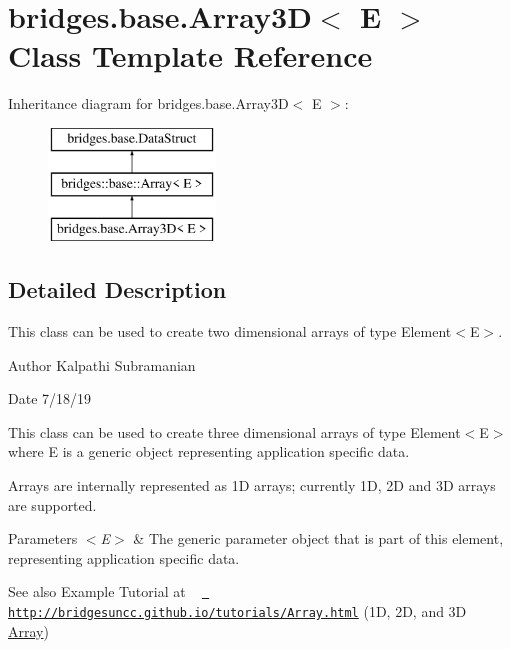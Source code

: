\hypertarget{classbridges_1_1base_1_1_array3_d}{}\section{bridges.\+base.\+Array3D$<$ E $>$ Class Template Reference}
\label{classbridges_1_1base_1_1_array3_d}
Inheritance diagram for bridges.\+base.\+Array3D$<$ E $>$\+:\begin{figure}[H]
\begin{center}
\leavevmode
\includegraphics[height=3.000000cm]{classbridges_1_1base_1_1_array3_d}
\end{center}
\end{figure}


\subsection{Detailed Description}
This class can be used to create two dimensional arrays of type Element$<$\+E$>$. 

\begin{DoxyAuthor}{Author}
Kalpathi Subramanian
\end{DoxyAuthor}
\begin{DoxyDate}{Date}
7/18/19
\end{DoxyDate}
This class can be used to create three dimensional arrays of type Element$<$\+E$>$ where E is a generic object representing application specific data.

Arrays are internally represented as 1D arrays; currently 1D, 2D and 3D arrays are supported.


\begin{DoxyParams}{Parameters}
{\em $<$\+E$>$} & The generic parameter object that is part of this element, representing application specific data.\\
\hline
\end{DoxyParams}
\begin{DoxySeeAlso}{See also}
Example Tutorial at ~\newline
 \href{http://bridgesuncc.github.io/tutorials/Array.html}{\texttt{ http\+://bridgesuncc.\+github.\+io/tutorials/\+Array.\+html}} (1D, 2D, and 3D \mbox{\hyperlink{classbridges_1_1base_1_1_array}{Array}})~\newline
 
\end{DoxySeeAlso}
